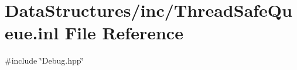 \hypertarget{_thread_safe_queue_8inl}{}\section{Data\+Structures/inc/\+Thread\+Safe\+Queue.inl File Reference}
\label{_thread_safe_queue_8inl}
{\ttfamily \#include \char`\"{}Debug.\+hpp\char`\"{}}\newline
